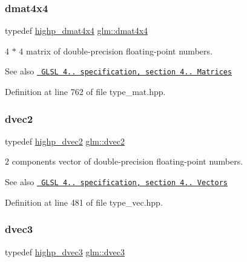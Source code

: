 \subsubsection{\texorpdfstring{dmat4x4}{dmat4x4}}
{\footnotesize\ttfamily typedef \mbox{\hyperlink{group__core__precision_ga46855bd8fdcb8dbc7db5d2aaeb91be69}{highp\+\_\+dmat4x4}} \mbox{\hyperlink{group__core__types_ga54d90d4b902d93638b906571af215bb1}{glm\+::dmat4x4}}}

4 $\ast$ 4 matrix of double-\/precision floating-\/point numbers.

\begin{DoxySeeAlso}{See also}
\href{http://www.opengl.org/registry/doc/GLSLangSpec.4.20.8.pdf}{\texttt{ G\+L\+SL 4.. specification, section 4.. Matrices}} 
\end{DoxySeeAlso}


Definition at line 762 of file type\+\_\+mat.\+hpp.

\mbox{\label{group__core__types_gae6727259898288cae197724d5f172b3b}} 
\subsubsection{\texorpdfstring{dvec2}{dvec2}}
{\footnotesize\ttfamily typedef \mbox{\hyperlink{group__core__precision_ga74ad90a083be6c50f6c285d6ab15a198}{highp\+\_\+dvec2}} \mbox{\hyperlink{group__core__types_gae6727259898288cae197724d5f172b3b}{glm\+::dvec2}}}

2 components vector of double-\/precision floating-\/point numbers.

\begin{DoxySeeAlso}{See also}
\href{http://www.opengl.org/registry/doc/GLSLangSpec.4.20.8.pdf}{\texttt{ G\+L\+SL 4.. specification, section 4.. Vectors}} 
\end{DoxySeeAlso}


Definition at line 481 of file type\+\_\+vec.\+hpp.

\mbox{\label{group__core__types_ga7f3287f952e6ccb481231368091702ac}} 
\subsubsection{\texorpdfstring{dvec3}{dvec3}}
{\footnotesize\ttfamily typedef \mbox{\hyperlink{group__core__precision_ga54e097f7cd1f1cd46cc47eec67218bd3}{highp\+\_\+dvec3}} \mbox{\hyperlink{group__core__types_ga7f3287f952e6ccb481231368091702ac}{glm\+::dvec3}}}

